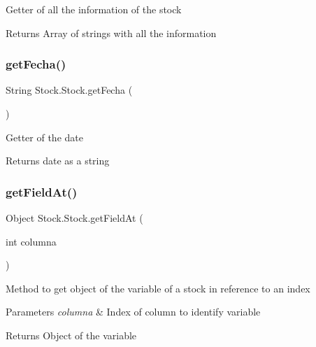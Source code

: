Getter of all the information of the stock

\begin{DoxyReturn}{Returns}
Array of strings with all the information 
\end{DoxyReturn}
\mbox{\label{class_stock_1_1_stock_a4f9b096fbfa184bb56e35fe5b2dd2cac}} 
\subsubsection{\texorpdfstring{get\+Fecha()}{getFecha()}}
{\footnotesize\ttfamily String Stock.\+Stock.\+get\+Fecha (\begin{DoxyParamCaption}{ }\end{DoxyParamCaption})}

Getter of the date

\begin{DoxyReturn}{Returns}
date as a string 
\end{DoxyReturn}
\mbox{\label{class_stock_1_1_stock_a7fbba145dd4040cc394bb0d903e43787}} 
\subsubsection{\texorpdfstring{get\+Field\+At()}{getFieldAt()}}
{\footnotesize\ttfamily Object Stock.\+Stock.\+get\+Field\+At (\begin{DoxyParamCaption}\item[{int}]{columna }\end{DoxyParamCaption})}

Method to get object of the variable of a stock in reference to an index


\begin{DoxyParams}{Parameters}
{\em columna} & Index of column to identify variable \\
\hline
\end{DoxyParams}
\begin{DoxyReturn}{Returns}
Object of the variable 
\end{DoxyReturn}
\mbox{\label{class_stock_1_1_stock_a8e00c1574f810330efb7c84ff971be09}} 
